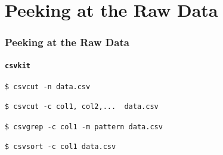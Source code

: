 \section{Peeking at the Raw Data}
\begin{frame}[fragile]
  \frametitle{Peeking at the Raw Data}
  \framesubtitle{\texttt{csvkit}}
  \lstset{tabsize=2,  language=Tex, basicstyle=\normalsize\ttfamily,
   breaklines=true, escapechar=*,  upquote=true}
  \begin{lstlisting}
$ csvcut -n data.csv 

$ csvcut -c col1, col2,...  data.csv 

$ csvgrep -c col1 -m pattern data.csv

$ csvsort -c col1 data.csv

  \end{lstlisting}
\end{frame}



